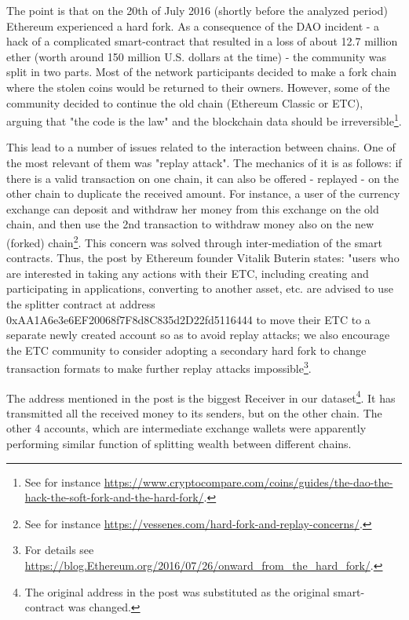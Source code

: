 The point is that on the 20th of July 2016 (shortly before the analyzed period) Ethereum experienced a hard fork.
As a consequence of the DAO incident - a hack of a complicated smart-contract that resulted in a loss of about 12.7 million ether (worth around 150 million U.S. dollars at the time) - the community was split in two parts.
Most of the network participants decided to make a fork chain where the stolen coins would be returned to their owners.
However, some of the community decided to continue the old chain (Ethereum Classic or ETC), arguing that "the code is the law" and the blockchain data should be irreversible\footnote{See for instance \url{https://www.cryptocompare.com/coins/guides/the-dao-the-hack-the-soft-fork-and-the-hard-fork/}.}.

This lead to a number of issues related to the interaction between chains.
One of the most relevant of them was "replay attack".
The mechanics of it is as follows:
if there is a valid transaction on one chain, it can also be offered - replayed - on the other chain to duplicate the received amount.
For instance, a user of the currency exchange can deposit and withdraw her money from this exchange on the old chain, and then use the 2nd transaction to withdraw money also on the new (forked) chain\footnote{See for instance \url{https://vessenes.com/hard-fork-and-replay-concerns/}.}.
This concern was solved through inter-mediation of the smart contracts.
Thus, the post by Ethereum founder Vitalik Buterin states:
"users who are interested in taking any actions with their ETC, including creating and participating in applications, converting to another asset, etc. are advised to use the splitter contract at address 0xAA1A6e3e6EF20068f7F8d8C835d2D22fd5116444 to move their ETC to a separate newly created account so as to avoid replay attacks; we also encourage the ETC community to consider adopting a secondary hard fork to change transaction formats to make further replay attacks impossible\footnote{For details see \url{https://blog.Ethereum.org/2016/07/26/onward_from_the_hard_fork/}.}.

The address mentioned in the post is the biggest Receiver in our dataset\footnote{The original address in the post was substituted as the original smart-contract was changed.}.
It has transmitted all the received money to its senders, but on the other chain.
The other 4 accounts, which are intermediate exchange wallets were apparently performing similar function of splitting wealth between different chains.

